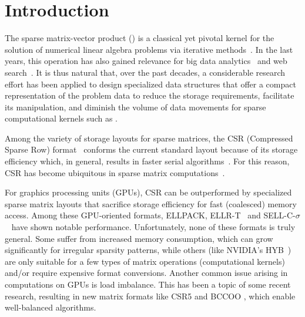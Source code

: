 \section{Introduction}

The sparse matrix-vector product (\spmv) is a classical yet pivotal kernel for the solution of numerical linear algebra problems 
via iterative methods~\cite{saad}.
In the last years, this operation has also gained relevance for 
big data analytics~\cite{Buo15}
and web search~\cite{pagerank}.
It is thus natural that, over the past decades, a considerable research effort has been applied to design
specialized data structures
that offer a compact representation of the problem data to
reduce the storage requirements, facilitate its manipulation,
and diminish the volume of data movements
for sparse computational kernels such as \spmv.

Among the variety of storage layouts for sparse matrices,
the CSR (Compressed Sparse Row) format~\cite{saad}
conforms the current standard layout
because of its storage efficiency which, in general, results in
faster serial algorithms~\cite{Buluc:2009:PSM:1583991.1584053}.
For this reason, CSR has become ubiquitous
in sparse matrix
computations~\cite{saad,Davis06,Buluc:2009:PSM:1583991.1584053}.

For graphics processing units (GPUs), CSR can be outperformed by
specialized sparse matrix layouts that sacrifice storage efficiency
for fast (coalesced) memory access.
Among these GPU-oriented formats,
ELLPACK, ELLR-T~\cite{CPE:CPE1658} and
SELL-C-$\sigma$~\cite{Kreu14,SELL-P} have shown notable performance.
Unfortunately, none of these formats is truly general.
Some suffer from increased memory consumption, which can grow significantly
for irregular sparsity patterns, while others
(like NVIDIA's HYB~\cite{cusparse})
are only suitable for a few types of matrix operations (computational kernels)
and/or require expensive format conversions. 
Another common issue arising in
\spmv computations on GPUs is load imbalance. This has been a topic of some
recent research, resulting in new matrix formats like CSR5 \cite{csr5} and
BCCOO \cite{bccoo}, which enable well-balanced \spmv algorithms.

